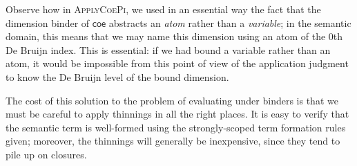 \documentclass{article}
\makeatletter
\DeclarePairedDelimiter\Parens{\lparen}{\rparen}
\newcommand\FmtKwd[1]{\mathsf{#1}}
\newcommand\DeclBox[1]{\framebox{$\displaystyle{}#1$}}
\newcommand\FmtThin[1]{{\color{ProcessBlue}#1}}
\newcommand\ThinId{\mathsf{id}}
\newcommand\ThinKeep[1]{\mbox{\leftthumbsdown}\!\!\rangle\!{#1}\!\langle\!\!\mbox{\rightthumbsdown}}
\newcommand\ThinSkip[1]{{#1}.\mbox{\faTrashO}}
\newcommand\FormatList[3]{%
  \xintFor ##1 in {#3} \do{%
    #1{##1}%
    \xintifForLast{}{#2}
  }
}
\newcommand\Atom[1]{{\boldsymbol\alpha}_{#1}}
\newcommand\FmtVal[1]{{\color{Red}{#1}}}
\newcommand\VExp[2]{
  \FmtVal{
    \Parens*{
      \FmtKwd{#1}\
      \FormatList{}{\ }{#2}
    }
  }
}
\newcommand\EvalClo[2]{\FmtVal{#1}\Downarrow\FmtVal{#2}}
\newcommand\Reflect[3]{\FmtVal{#1}\ni\FmtVal{#2}\uparrow\FmtVal{#3}}
\newcommand\Apply[3]{\FmtVal{#1}\mathrel{@}\FmtVal{#2}\Downarrow\FmtVal{#3}}
\newcommand\InstClo[3]{\FmtVal{#1}\bullet\FmtVal{#2}\Downarrow\FmtVal{#3}}
\newcommand\ThinVal[2]{\widehat{\FmtThin{#1}}\Parens*{\FmtVal{#2}}}
\makeatother
\begin{document}

Observe how in \textsc{ApplyCoePi}, we used in an essential way the
fact that the dimension binder of $\FmtKwd{coe}$ abstracts an
\emph{atom} rather than a \emph{variable}; in the semantic domain,
this means that we may name this dimension using an atom of the $0$th
De Bruijn index. This is essential: if we had bound a variable rather
than an atom, it would be impossible from this point of view of the
application judgment to know the De Bruijn level of the bound
dimension.

The cost of this solution to the problem of evaluating under binders
is that we must be careful to apply thinnings in all the right
places. It is easy to verify that the semantic term is well-formed
using the strongly-scoped term formation rules given; moreover, the
thinnings will generally be inexpensive, since they tend to pile up on
closures.
\end{document}

